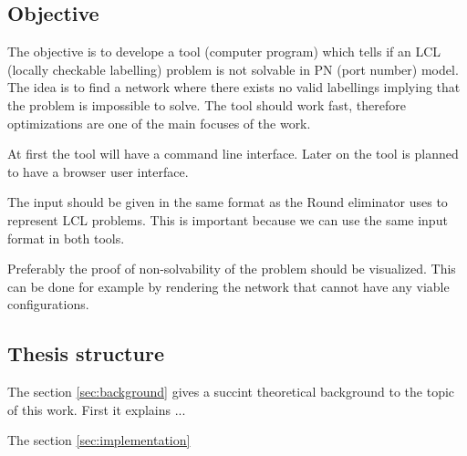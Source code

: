 \subsection*{Objective} %
The objective is to develope a tool (computer program) which tells if an LCL (locally checkable labelling) problem is not solvable in PN (port number) model.
The idea is to find a network where there exists no valid labellings implying that the problem is impossible to solve.
The tool should work fast, therefore optimizations are one of the main focuses of the work.

At first the tool will have a command line interface.
Later on the tool is planned to have a browser user interface.

The input should be given in the same format as the Round eliminator uses to represent LCL problems.
This is important because we can use the same input format in both tools.

Preferably the proof of non-solvability of the problem should be visualized.
This can be done for example by rendering the network that cannot have any viable configurations.

\subsection{Thesis structure}
The section \ref{sec:background} gives a succint theoretical background to the topic of this work.
First it explains ... %

The section \ref{sec:implementation}

